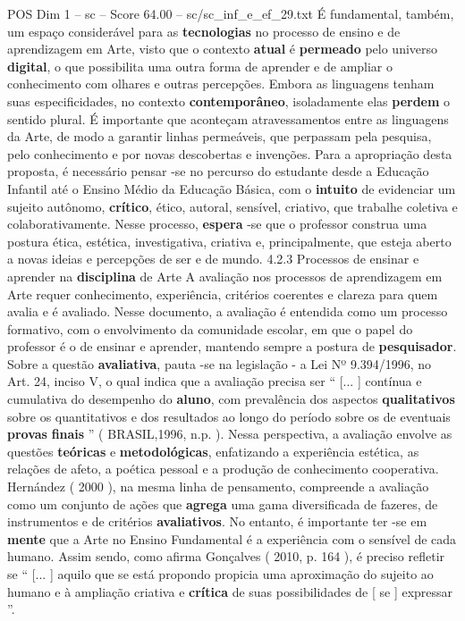 \begin{textsample}{POS Dim 1 – sc – Score 64.00 – sc/sc\_inf\_e\_ef\_29.txt}
É fundamental, também, um espaço considerável para as \textbf{tecnologias} no processo de ensino e de aprendizagem em Arte, visto que o contexto \textbf{atual} é \textbf{permeado} pelo universo \textbf{digital}, o que possibilita uma outra forma de aprender e de ampliar o conhecimento com olhares e outras percepções.
Embora as linguagens tenham suas especificidades, no contexto \textbf{contemporâneo}, isoladamente elas \textbf{perdem} o sentido plural.
É importante que aconteçam atravessamentos entre as linguagens da Arte, de modo a garantir linhas permeáveis, que perpassam pela pesquisa, pelo conhecimento e por novas descobertas e invenções.
Para a apropriação desta proposta, é necessário pensar -se no percurso do estudante desde a Educação Infantil até o Ensino Médio da Educação Básica, com o \textbf{intuito} de evidenciar um sujeito autônomo, \textbf{crítico}, ético, autoral, sensível, criativo, que trabalhe coletiva e colaborativamente.
Nesse processo, \textbf{espera} -se que o professor construa uma postura ética, estética, investigativa, criativa e, principalmente, que esteja aberto a novas ideias e percepções de ser e de mundo. 4.2.3 Processos de ensinar e aprender na \textbf{disciplina} de Arte A avaliação nos processos de aprendizagem em Arte requer conhecimento, experiência, critérios coerentes e clareza para quem avalia e é avaliado.
Nesse documento, a avaliação é entendida como um processo formativo, com o envolvimento da comunidade escolar, em que o papel do professor é o de ensinar e aprender, mantendo sempre a postura de \textbf{pesquisador}.
Sobre a questão \textbf{avaliativa}, pauta -se na legislação - a Lei Nº 9.394/1996, no Art. 24, inciso V, o qual indica que a avaliação precisa ser “ [... ] contínua e cumulativa do desempenho do \textbf{aluno}, com prevalência dos aspectos \textbf{qualitativos} sobre os quantitativos e dos resultados ao longo do período sobre os de eventuais \textbf{provas} \textbf{finais} ” ( BRASIL,1996, n.p. ).
Nessa perspectiva, a avaliação envolve as questões \textbf{teóricas} e \textbf{metodológicas}, enfatizando a experiência estética, as relações de afeto, a poética pessoal e a produção de conhecimento cooperativa.
Hernández ( 2000 ), na mesma linha de pensamento, compreende a avaliação como um conjunto de ações que \textbf{agrega} uma gama diversificada de fazeres, de instrumentos e de critérios \textbf{avaliativos}.
No entanto, é importante ter -se em \textbf{mente} que a Arte no Ensino Fundamental é a experiência com o sensível de cada humano.
Assim sendo, como afirma Gonçalves ( 2010, p. 164 ), é preciso refletir se “ [... ] aquilo que se está propondo propicia uma aproximação do sujeito ao humano e à ampliação criativa e \textbf{crítica} de suas possibilidades de [ se ] expressar ”.

\end{textsample}
